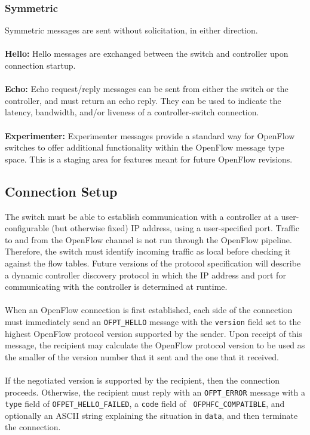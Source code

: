 \documentclass[10pt]{article}
\begin{document}
\subsubsection{Symmetric}
Symmetric messages are sent without solicitation, in either direction.
\\\\
\textbf{Hello:} Hello messages are exchanged between the switch and controller upon connection startup.
\\\\
\textbf{Echo:} Echo request/reply messages can be sent from either the switch or the controller, and must return an echo reply.  They can be used to indicate the latency, bandwidth, and/or liveness of a controller-switch connection.
\\\\
\textbf{Experimenter:} Experimenter messages provide a standard way for OpenFlow switches to offer additional functionality within the OpenFlow message type space.  This is a staging area for features meant for future OpenFlow revisions.

\subsection{Connection Setup}
The switch must be able to establish communication with a controller at a user-configurable (but otherwise fixed) IP address, using a user-specified port.  Traffic to and from the OpenFlow channel is not run through the OpenFlow pipeline.  Therefore, the switch must identify incoming traffic as local before checking it against the flow tables.  Future versions of the protocol specification will describe a dynamic controller discovery protocol in which the IP address and port for communicating with the controller is determined at runtime.
\\\\
When an OpenFlow connection is first established, each side of the connection must immediately send an \verb|OFPT_HELLO| message with the \verb|version| field set to the highest OpenFlow protocol version supported by the sender.  Upon receipt of this message, the recipient may calculate the OpenFlow protocol version to be used as the smaller of the version number that it sent and the one that it received.
\\\\
If the negotiated version is supported by the recipient, then the connection proceeds. Otherwise, the recipient must reply with an \verb|OFPT_ERROR| message with a \verb|type| field of \verb|OFPET_HELLO_FAILED|, a \verb|code| field of \verb| OFPHFC_COMPATIBLE|, and optionally an ASCII string explaining the situation in \verb|data|, and then terminate the connection.
\end{document}
